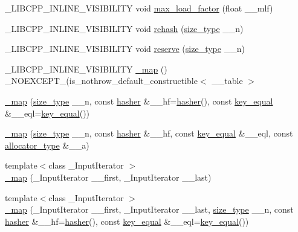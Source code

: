 \begin{DoxyCompactItemize}
\item 
\+\_\+\+L\+I\+B\+C\+P\+P\+\_\+\+I\+N\+L\+I\+N\+E\+\_\+\+V\+I\+S\+I\+B\+I\+L\+I\+T\+Y void \hyperlink{class__map_a4a1d886753e2634e24d8c5318c753f64}{max\+\_\+load\+\_\+factor} (float \+\_\+\+\_\+mlf)
\item 
\+\_\+\+L\+I\+B\+C\+P\+P\+\_\+\+I\+N\+L\+I\+N\+E\+\_\+\+V\+I\+S\+I\+B\+I\+L\+I\+T\+Y void \hyperlink{class__map_ac2d82322f2c9ffc79224c271e6f53a0c}{rehash} (\hyperlink{class__map_adc37f621be25fda072b12873e60e9fc7}{size\+\_\+type} \+\_\+\+\_\+n)
\item 
\+\_\+\+L\+I\+B\+C\+P\+P\+\_\+\+I\+N\+L\+I\+N\+E\+\_\+\+V\+I\+S\+I\+B\+I\+L\+I\+T\+Y void \hyperlink{class__map_a9dc37c2afafe865039cf449cf301c25d}{reserve} (\hyperlink{class__map_adc37f621be25fda072b12873e60e9fc7}{size\+\_\+type} \+\_\+\+\_\+n)
\item 
\+\_\+\+L\+I\+B\+C\+P\+P\+\_\+\+I\+N\+L\+I\+N\+E\+\_\+\+V\+I\+S\+I\+B\+I\+L\+I\+T\+Y \hyperlink{class__map_a17a1f453f8e0edf0d2b7eccdf2d1ea94}{\+\_\+map} () \+\_\+\+N\+O\+E\+X\+C\+E\+P\+T\+\_\+(is\+\_\+nothrow\+\_\+default\+\_\+constructible$<$ \+\_\+\+\_\+table $>$
\item 
\hyperlink{class__map_a5508ef9d7f61808bfbcf817472f9aaea}{\+\_\+map} (\hyperlink{class__map_adc37f621be25fda072b12873e60e9fc7}{size\+\_\+type} \+\_\+\+\_\+n, const \hyperlink{class__map_a1ca536646126d87b3ac0b7fe3aee3534}{hasher} \&\+\_\+\+\_\+hf=\hyperlink{class__map_a1ca536646126d87b3ac0b7fe3aee3534}{hasher}(), const \hyperlink{class__map_ac341e21272b7041e034855227f1cce49}{key\+\_\+equal} \&\+\_\+\+\_\+eql=\hyperlink{class__map_ac341e21272b7041e034855227f1cce49}{key\+\_\+equal}())
\item 
\hyperlink{class__map_a475e5f7a3b66019efb2d498e6be72514}{\+\_\+map} (\hyperlink{class__map_adc37f621be25fda072b12873e60e9fc7}{size\+\_\+type} \+\_\+\+\_\+n, const \hyperlink{class__map_a1ca536646126d87b3ac0b7fe3aee3534}{hasher} \&\+\_\+\+\_\+hf, const \hyperlink{class__map_ac341e21272b7041e034855227f1cce49}{key\+\_\+equal} \&\+\_\+\+\_\+eql, const \hyperlink{class__map_ab38dd0bcf1867887afc2be61257ef025}{allocator\+\_\+type} \&\+\_\+\+\_\+a)
\item 
{\footnotesize template$<$class \+\_\+\+Input\+Iterator $>$ }\\\hyperlink{class__map_a83c8c4b10e33f323aebd39c57bc871c1}{\+\_\+map} (\+\_\+\+Input\+Iterator \+\_\+\+\_\+first, \+\_\+\+Input\+Iterator \+\_\+\+\_\+last)
\item 
{\footnotesize template$<$class \+\_\+\+Input\+Iterator $>$ }\\\hyperlink{class__map_abddb1ea6324cfb5b7ea0ed5053e19444}{\+\_\+map} (\+\_\+\+Input\+Iterator \+\_\+\+\_\+first, \+\_\+\+Input\+Iterator \+\_\+\+\_\+last, \hyperlink{class__map_adc37f621be25fda072b12873e60e9fc7}{size\+\_\+type} \+\_\+\+\_\+n, const \hyperlink{class__map_a1ca536646126d87b3ac0b7fe3aee3534}{hasher} \&\+\_\+\+\_\+hf=\hyperlink{class__map_a1ca536646126d87b3ac0b7fe3aee3534}{hasher}(), const \hyperlink{class__map_ac341e21272b7041e034855227f1cce49}{key\+\_\+equal} \&\+\_\+\+\_\+eql=\hyperlink{class__map_ac341e21272b7041e034855227f1cce49}{key\+\_\+equal}())

\end{DoxyCompactItemize}
